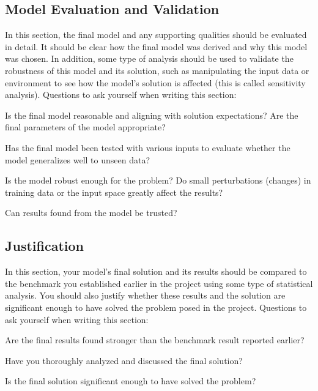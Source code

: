 \documentclass[12pt,journal,compsoc]{IEEEtran}
\begin{document}
\subsection{Model Evaluation and Validation}\label{sec:eval}
In this section, the final model and any supporting qualities should be evaluated in detail. It should be clear how the final model was derived and why this model was chosen. In addition, some type of analysis should be used to validate the robustness of this model and its solution, such as manipulating the input data or environment to see how the model’s solution is affected (this is called sensitivity analysis). Questions to ask yourself when writing this section:

Is the final model reasonable and aligning with solution expectations? Are the final parameters of the model appropriate?

Has the final model been tested with various inputs to evaluate whether the model generalizes well to unseen data?

Is the model robust enough for the problem? Do small perturbations (changes) in training data or the input space greatly affect the results?

Can results found from the model be trusted?

\subsection{Justification}
In this section, your model’s final solution and its results should be compared to the benchmark you established earlier in the project using some type of statistical analysis. You should also justify whether these results and the solution are significant enough to have solved the problem posed in the project. Questions to ask yourself when writing this section:

Are the final results found stronger than the benchmark result reported earlier?

Have you thoroughly analyzed and discussed the final solution?

Is the final solution significant enough to have solved the problem?
\end{document}
